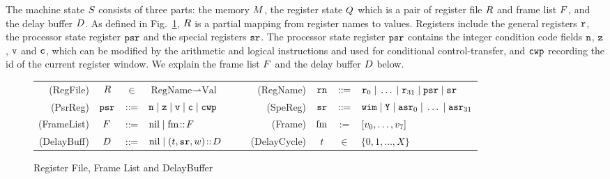 The machine state $S$ consists of three parts:
the memory $M$, the register state $Q$
which is a pair of register file $R$ and frame list $F$,
and the delay buffer $D$.
As defined in Fig.~\ref{fig:Register File and Frame List},
$R$ is a partial mapping
from register names to values.
Registers include the general registers $\texttt{r}$,
the processor state register $\texttt{psr}$
and the special registers $\texttt{sr}$.
The processor state register $\texttt{psr}$ contains
the integer condition code fields $\texttt{n}$,
$\texttt{z}$, $\texttt{v}$ and $\texttt{c}$,
which can be modified by the arithmetic and logical instructions
and used for conditional control-transfer,
and $\texttt{cwp}$ recording the id of the current register window.
We explain the frame list $F$ and the delay buffer
$D$ below.

\begin{figure}[!t]
	\small
	\begin{tabular}{rcclcrccl}
		(RegFile) & $R$ & $\in$ & $\text{RegName} \rightharpoonup 
			\text{Val}$

         & $\quad$ &
        (RegName) & $\texttt{rn}$ & $::\!\!{=}$ &
         $\texttt{r}_{0} \; | \; \dots \; | \; \texttt{r}_{31} \; | \; \texttt{psr} \; | \; \texttt{sr}$ \\
		
		(PsrReg) & $\texttt{psr}$ & $::\!\!{=}$ &
		$\texttt{n} \; | \;
			\texttt{z} \; | \;
			\texttt{v} \; | \;
			\texttt{c} \; | \; \texttt{cwp}$ & $\quad$ &
		(SpeReg) & $\texttt{sr}$ & $::\!\!{=}$ &
		$\texttt{wim} \; | \;
			\texttt{Y} \; | \;
\texttt{asr}_0 \; | \; \dots \; | \; \texttt{asr}_{31}$ \\
		
		(FrameList) & $F$ & $::\!\!{=}$ &
                            $\text{nil} \; | \; \text{fm} \!::\! F$ & $\quad$ &
		(Frame) & $\text{fm}$ & := & $[v_0, \dots, v_7]$ \\
		
		(DelayBuff) & $D$ & $::\!\!{=}$ & $\text{nil} \; | \;
                                  (t, \texttt{sr}, w) \!::\! D$
                                  & $\quad$
		& (DelayCycle) & $t$ & $\in$ & $\{ 0, 1, \dots, X \}$
	\end{tabular}
	\caption{Register File, Frame List and DelayBuffer}
	\label{fig:Register File and Frame List}
\end{figure}


